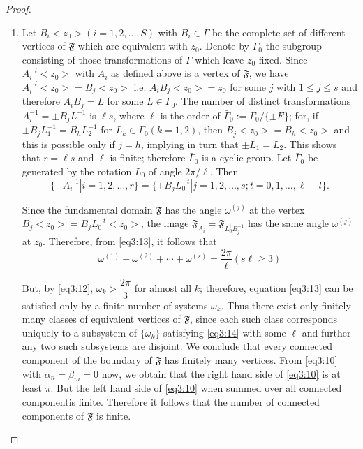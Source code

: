 \begin{proof}
\begin{enumerate}
We assume in the rest of the proof that $-E \in \Gamma$,
without loss of generality and denote $\Gamma/\{\pm E\}$ by
$\bar{\Gamma}$. 

\item Let \pageoriginale $B_i <z_0> (i=1,2,\ldots, S)$ with $B_i
  \in \Gamma$ be the complete set of different vertices of
  $\mathfrak{F}$ which are equivalent with $z_0$. Denote by $\Gamma_0$
  the subgroup consisting of those transformations of $\Gamma$ which
  leave $z_0$ fixed. Since $A^{-l}_i <z_0>$ with $A_i$ as defined
  above is a vertex of $\mathfrak{F}$, we have $A^{-l}_i <z_0> = B_j
  <z_0>$ i.e. $A_i B_j <z_0>=z_0$ for some $j$ with $1\leq j \leq s$
  and therefore $A_i B_j = L$ for some $L\in \Gamma_0$. The
  number of distinct transformations $A^{-1}_i = \pm B_j L^{-1}$ is
  $\ell s$, where $\ell$ is the order of $\bar{\Gamma}_0:=\Gamma_0/
  \{\pm E\}$; for, if $\pm B_j L^{-1}_1 = B_h L^{-1}_2$ for $L_k
  \in \Gamma_0(k=1,2)$, then $B_j <z_0>=B_h <z_0>$ and this is
  possible only if $j=h$, implying in turn that $\pm L_1 = L_2$. This
  shows that $r=\ell s$ and $\ell$ is finite; therefore
  $\bar{\Gamma}_0$ is a cyclic group. Let $\bar{\Gamma}_0$ be
  generated by the rotation $L_0$ of angle $2\pi/\ell$. Then
$$
\{\pm A^{-1}_i | i = 1, 2, \ldots, r\} = \{\pm B_j L^{-t}_0| j = 1, 2
, \ldots, s; t = 0,1, \ldots, \ell-l\}. 
$$

Since the fundamental domain $\mathfrak{F}$ has the angle
$\omega^{(j)}$ at the vertex $B_j <z_0>=B_j L^{-t}_0 <z_0>$, the image
$\mathfrak{F}_{A_i} = \mathfrak{F}_{L^t_0 B^{-1}_j}$ has the same
angle $\omega^{(j)}$ at $z_0$. Therefore, from \eqref{eq3:13}, it follows that 
\begin{equation*}
\omega^{(1)} + \omega^{(2)} + \cdots + \omega^{(s)} =
\frac{2\pi}{\ell} (s\ell \geq 3) \tag{14}\label{eq3:14}
\end{equation*}

But, by \eqref{eq3:12}, $\omega_k > \dfrac{2\pi}{3}$ for almost all $k$;
therefore, equation \eqref{eq3:13} can be satisfied only by a finite number of
systems $\omega_k$. Thus there exist only finitely many classes of
equivalent vertices of $\mathfrak{F}$, since each such class
corresponds uniquely to a subsystem of $\{\omega_k\}$ satisfying \eqref{eq3:14}
with some $\ell$ and further any two such subsystems are disjoint. We
conclude that every connected component of the boundary of
$\mathfrak{F}$ has finitely many vertices. From \eqref{eq3:10} with $\alpha_n =
\beta_m =0$ now, we obtain that the right hand side of \eqref{eq3:10} is at
least $\pi$. But the left hand side of \eqref{eq3:10} when summed over all
connected component\pageoriginale is finite. Therefore it follows
that the number of connected components of $\mathfrak{F}$ is finite.


\end{enumerate}
\end{proof}
